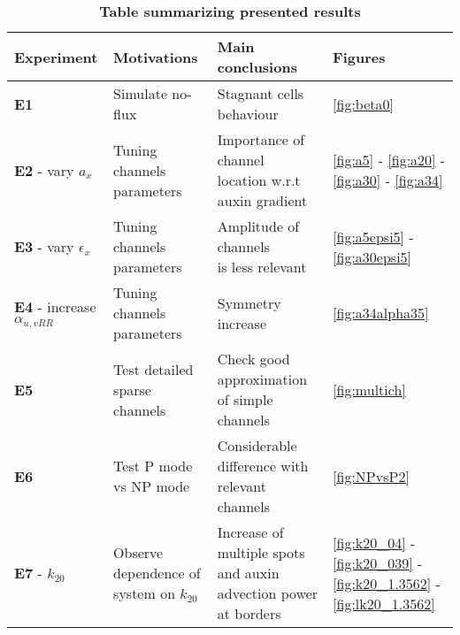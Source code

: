 \begin{table}[H]
  \caption*{\textbf{Table summarizing presented results}}
    \begin{tabular}{|p{3cm} |l l p{3cm}|}
    \hline
    \textbf{Experiment} & \textbf{Motivations} & \textbf{Main conclusions} & \textbf{Figures} \T\B \\
    \hline \hline
    \textbf{E1} & Simulate no-flux & \parbox[t]{4cm}{Stagnant cells \\ behaviour \T\B} & \ref{fig:beta0}  \T\B\\
    \hline
    \textbf{E2} - vary $a_x$ & \parbox[t]{4cm}{Tuning channels \\ parameters} & \parbox[t]{4cm}{Importance of channel \\ location w.r.t \\ auxin gradient \T\B} & \ref{fig:a5} - \ref{fig:a20} -\ref{fig:a30} - \ref{fig:a34}  \T\B\\
    \hline
    \textbf{E3} - vary $\epsilon_x$ & \parbox[t]{4cm}{Tuning channels \\ parameters} & \parbox[t]{4cm}{Amplitude of channels \\ is less relevant} & \ref{fig:a5epsi5} - \ref{fig:a30epsi5} \T\B\\
    \hline
    \textbf{E4} - increase $\alpha_{u,vRR}$ & \parbox[t]{4cm}{Tuning channels \\ parameters} & Symmetry increase & \ref{fig:a34alpha35} \T\B\\
    \hline
    \textbf{E5} & \parbox[t]{4cm}{Test detailed \\ sparse channels} & \parbox[t]{4cm}{Check good approximation of simple channels \T\B} & \ref{fig:multich} \T\B\\
    \hline
    \textbf{E6} & \parbox[t]{4cm}{Test P mode \\ vs NP mode} & \parbox[t]{4cm}{Considerable \\ difference with \\ relevant channels \T\B} & \ref{fig:NPvsP2} \T\B\\
    \hline
    \textbf{E7} - $k_{20}$ & \parbox[t]{3cm}{Observe dependence of system on $k_{20}$} & \parbox[t]{4cm}{Increase of multiple spots and auxin advection power at borders \T\B} & \ref{fig:k20_04} - \ref{fig:k20_039} - \ref{fig:k20_1.3562} - \ref{fig:lk20_1.3562}\T\B\\

\end{tabular}
\end{table}
